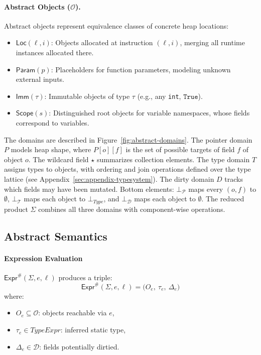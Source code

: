 \paragraph{Abstract Objects ($\mathcal{O}$).}
Abstract objects represent equivalence classes of concrete heap locations:
\begin{itemize}
    \item $\mathsf{Loc}(\ell,i)$: Objects allocated at instruction $(\ell,i)$, merging all runtime instances allocated there.
    \item $\mathsf{Param}(p)$: Placeholders for function parameters, modeling unknown external inputs.
    \item $\mathsf{Imm}(\tau)$: Immutable objects of type $\tau$ (e.g., any \texttt{int}, $\mathtt{True}$).
    \item $\mathsf{Scope}(s)$: Distinguished root objects for variable namespaces, whose fields correspond to variables.
\end{itemize}

The domains are described in Figure~\ref{fig:abstract-domains}. The pointer domain $P$ models heap shape, where $P[o][f]$ is the set of possible targets of field $f$ of object $o$. The wildcard field $\star$ summarizes collection elements. The type domain $T$ assigns types to objects, with ordering and join operations defined over the type lattice (see Appendix~\ref{sec:appendix-typesystem}). The dirty domain $D$ tracks which fields may have been mutated. Bottom elements: $\bot_\mathcal{P}$ maps every $(o,f)$ to $\emptyset$, $\bot_{\mathcal{T}}$ maps each object to $\bot_{\mathit{Type}}$, and $\bot_\mathcal{D}$ maps each object to $\emptyset$. The reduced product $\Sigma$ combines all three domains with component-wise operations.

\subsection{Abstract Semantics}

\paragraph{Expression Evaluation} $\mathsf{Expr}^\#(\Sigma, e, \ell)$ produces a triple:
\[
\mathsf{Expr}^\#(\Sigma, e, \ell) = \big(O_e,\ \tau_e,\ \Delta_e\big)
\]
where:
\begin{itemize}
    \item $O_e \subseteq \mathcal{O}$: objects reachable via $e$,
    \item $\tau_e \in \mathit{TypeExpr}$: inferred static type,
    \item $\Delta_e \in \mathcal{D}$: fields potentially dirtied.
\end{itemize}

